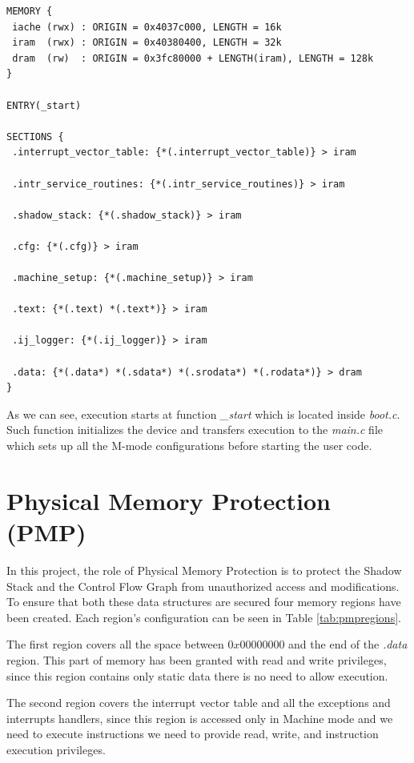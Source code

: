 \begin{lstlisting}[style=CStyle, caption= Simplified linker script, label={lst:linker}]
MEMORY {
 iache (rwx) : ORIGIN = 0x4037c000, LENGTH = 16k
 iram  (rwx) : ORIGIN = 0x40380400, LENGTH = 32k
 dram  (rw)  : ORIGIN = 0x3fc80000 + LENGTH(iram), LENGTH = 128k
}

ENTRY(_start)

SECTIONS {
 .interrupt_vector_table: {*(.interrupt_vector_table)} > iram

 .intr_service_routines: {*(.intr_service_routines)} > iram

 .shadow_stack: {*(.shadow_stack)} > iram

 .cfg: {*(.cfg)} > iram

 .machine_setup: {*(.machine_setup)} > iram

 .text: {*(.text) *(.text*)} > iram

 .ij_logger: {*(.ij_logger)} > iram

 .data: {*(.data*) *(.sdata*) *(.srodata*) *(.rodata*)} > dram
}
\end{lstlisting}

As we can see, execution starts at function \textit{\_start} which is located inside
\textit{boot.c}. Such function initializes the device and transfers execution to
the \textit{main.c} file which sets up all the M-mode configurations before
starting the user code.

\section{Physical Memory Protection (PMP)}
\label{sec:project_pmp}

In this project, the role of Physical Memory Protection is to protect the Shadow
Stack and the Control Flow Graph from unauthorized access and modifications. To ensure
that both these data structures are secured four memory regions have been created.
Each region's configuration can be seen in Table \ref{tab:pmpregions}.

The first region covers all the space between $0x00000000$ and the end of the
\textit{.data} region. This part of memory has been granted with read and write
privileges, since this region contains only static data there is no need to allow
execution.

The second region covers the interrupt vector table and all the exceptions and interrupts
handlers, since this region is accessed only in Machine mode and we need to
execute instructions we need to provide read, write, and instruction execution
privileges.

